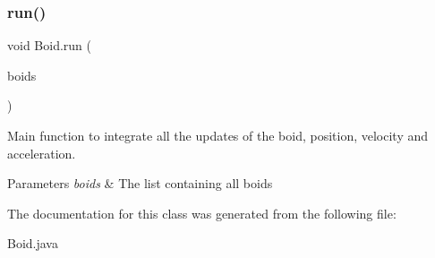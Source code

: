 \subsubsection{\texorpdfstring{run()}{run()}}
{\footnotesize\ttfamily void Boid.\+run (\begin{DoxyParamCaption}\item[{Array\+List$<$ \mbox{\hyperlink{class_boid}{Boid}} $>$}]{boids }\end{DoxyParamCaption})\hspace{0.3cm}{\ttfamily [inline]}}



Main function to integrate all the updates of the boid, position, velocity and acceleration. 


\begin{DoxyParams}{Parameters}
{\em boids} & The list containing all boids \\
\hline
\end{DoxyParams}


The documentation for this class was generated from the following file\+:\begin{DoxyCompactItemize}
\item 
Boid.\+java\end{DoxyCompactItemize}
